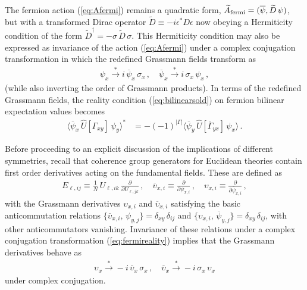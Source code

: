 \documentclass [12pt]{article}
\begin{document}
The fermion action (\ref{eq:Afermi}) remains a quadratic form,
$
    \widetilde A_{\rm fermi} = (\overline\psi,\widetilde D\, \psi)
$,
but with a transformed Dirac operator
$\widetilde D \equiv -i \epsilon^* D \epsilon$
now obeying a Hermiticity condition of the form
$\widetilde D^\dagger = - \sigma \, \widetilde D \, \sigma$.
This Hermiticity condition may also be expressed as invariance of
the action (\ref{eq:Afermi}) under a complex conjugation transformation
in which the redefined Grassmann fields transform as
\begin{align}
    \psi_x \xrightarrow{*}  i \, \overline\psi_x \, \sigma_x \,,\quad
    \overline\psi_x \xrightarrow{*}  i \, \sigma_x \, \psi_x \,,
\label{eq:fermireality}
\end{align}
(while also inverting the order of Grassmann products).
In terms of the redefined Grassmann fields,
the reality condition (\ref{eq:bilinearsold}) on fermion bilinear
expectation values becomes
\begin{align}
    \big\langle \overline \psi_x \, \hat U[\Gamma_{xy}] \, \psi_y \big\rangle^*
    &=
    -(-1)^{|\Gamma|}
    \big\langle \overline \psi_y \, \hat U[\overline\Gamma_{yx}] \, \psi_x \big\rangle \,.
\label{eq:fermirealityobs}
\end{align}

Before proceeding to an explicit discussion of the implications
of different symmetries,
recall that coherence group generators for Euclidean theories
contain first order derivatives acting on the fundamental fields.
These are defined as
\begin{align}
    E_{\ell,ij} \equiv
    \frac 1N \, U_{\ell,ik} \, \frac{\partial}{\partial U_{\ell,jk}} \,,
    \quad
    \overline \upsilon_{x,i} \equiv \frac{\partial}{\partial \psi_{x,i}} \,,
    \quad
    \upsilon_{x,i} \equiv \frac{\partial}{\partial \overline\psi_{x,i}} \,,
\end{align}
with the Grassmann derivatives $\upsilon_{x,i}$ and $\overline\upsilon_{x,i}$
satisfying the basic anticommutation relations
$
    \{ \overline\upsilon_{x,i},\, \psi_{y,j} \} = \delta_{xy} \, \delta_{ij}
$
and
$
    \{ \upsilon_{x,i},\, \overline\psi_{y,j} \} = \delta_{xy} \, \delta_{ij}
$,
with other anticommutators vanishing.
Invariance of these relations under a
complex conjugation transformation (\ref{eq:fermireality})
implies that the Grassmann derivatives behave as
\begin{align}
    \upsilon_x \xrightarrow{*}  -i \, \overline\upsilon_x \, \sigma_x \,,\quad
    \overline\upsilon_x \xrightarrow{*}  -i \, \sigma_x \, \upsilon_x 
\label{eq:fermirealityv}
\end{align}
under complex conjugation.
\end{document}

